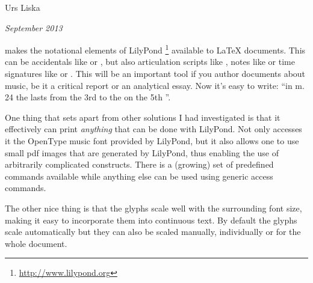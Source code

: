 \documentclass[oneside]{article}
\begin{document}
\begin{center}
{ \Huge \lilyglyphs }

\bigskip
{ \Large Urs Liska }

\emph{September 2013} 

\end{center}

\bigskip
\lilyglyphs{} makes the notational elements of LilyPond%
\footnote{\url{http://www.lilypond.org}}
available to \LaTeX{} documents.
This can be accidentals like \flat{} or \sharp, but also articulation scripts like \hspace{.1ex} \fermata, notes like \crotchet{} or time signatures like \lilyTimeCHalf{} or .
This will be an important tool if you author documents about music, be it a critical report or an analytical essay.
Now it's easy to write: “in m.\,24 the \decrescHairpin{} lasts from the 3rd to the  on the 5th \semiquaverDown”.

One thing that sets \lilyglyphs{} apart from other solutions I had investigated is that it effectively can print \emph{anything} that can be done with LilyPond. 
Not only accesses it the OpenType music font provided by LilyPond, but it also allows one to use small pdf images that are generated by LilyPond, thus enabling the use of arbitrarily complicated constructs.
There is a (growing) set of predefined commands available while anything else can be used using generic access commands.

The other nice thing is that the glyphs scale well with the surrounding font size, making it easy to incorporate them into continuous text.
By default the glyphs scale automatically but they can also be scaled manually, individually or for the whole document.
\end{document}
